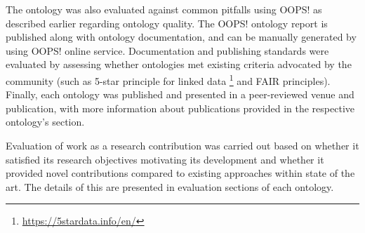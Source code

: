 The ontology was also evaluated against common pitfalls using OOPS! as described earlier regarding ontology quality. The OOPS! ontology report is published along with ontology documentation, and can be manually generated by using OOPS! online service. Documentation and publishing standards were evaluated by assessing whether ontologies met existing criteria advocated by the community (such as 5-star principle for linked data \footnote{\url{https://5stardata.info/en/}} and FAIR principles). Finally, each ontology was published and presented in a peer-reviewed venue and publication, with more information about publications provided in the respective ontology's section.

Evaluation of work as a research contribution was carried out based on whether it satisfied its research objectives motivating its development and whether it provided novel contributions compared to existing approaches within state of the art. The details of this are presented in evaluation sections of each ontology.

